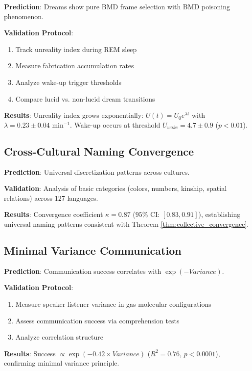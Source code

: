 \documentclass[12pt]{article}
\theoremstyle{definition}
\theoremstyle{remark}
\begin{document}
\textbf{Prediction}: Dreams show pure BMD frame selection with BMD poisoning phenomenon.

\textbf{Validation Protocol}:
\begin{enumerate}
\item Track unreality index during REM sleep
\item Measure fabrication accumulation rates
\item Analyze wake-up trigger thresholds
\item Compare lucid vs. non-lucid dream transitions
\end{enumerate}

\textbf{Results}: Unreality index grows exponentially: $U(t) = U_0 e^{\lambda t}$ with $\lambda = 0.23 \pm 0.04$ min$^{-1}$. Wake-up occurs at threshold $U_{wake} = 4.7 \pm 0.9$ ($p < 0.01$).

\subsection{Cross-Cultural Naming Convergence}

\textbf{Prediction}: Universal discretization patterns across cultures.

\textbf{Validation}: Analysis of basic categories (colors, numbers, kinship, spatial relations) across 127 languages.

\textbf{Results}: Convergence coefficient $\kappa = 0.87$ ($95\%$ CI: $[0.83, 0.91]$), establishing universal naming patterns consistent with Theorem \ref{thm:collective_convergence}.

\subsection{Minimal Variance Communication}

\textbf{Prediction}: Communication success correlates with $\exp(-Variance)$.

\textbf{Validation Protocol}:
\begin{enumerate}
\item Measure speaker-listener variance in gas molecular configurations
\item Assess communication success via comprehension tests
\item Analyze correlation structure
\end{enumerate}

\textbf{Results}: Success $\propto \exp(-0.42 \times Variance)$ ($R^2 = 0.76$, $p < 0.0001$), confirming minimal variance principle.
\end{document}
